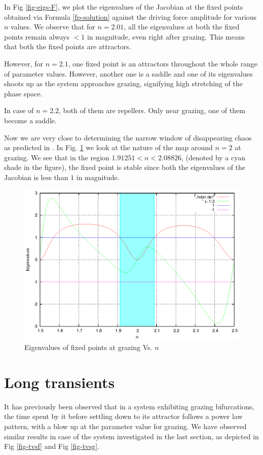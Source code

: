 \documentclass{book}
\renewcommand{\(}{\begin{columns}}
\renewcommand{\)}{\end{columns}}
\newcommand{\<}[1]{\begin{column}{#1}}
\renewcommand{\>}{\end{column}}
\begin{document}
In Fig \ref{fig-eigs-F}, we plot the eigenvalues of the Jacobian at the fixed 
points obtained via Formula \eqref{fp-solution} against the driving force 
amplitude for various $n$ values.  We observe that for $n=2.01$, all the 
eigenvalues at both the fixed points remain always $<1$ in magnitude, even right after grazing.  This 
means that both the fixed points are attractors.  


However, for $n=2.1$, one fixed point is an attractors throughout the whole 
range of parameter values.  However, another one is a saddle and one of its 
eigenvalues shoots up as the system approaches grazing, signifying high 
stretching of the phase space.  


In case of $n=2.2$, both of them are repellers.  Only near grazing, one of 
them become a saddle.   

Now we are very close to determining the narrow window of disappearing chaos 
as predicted in \cite{banerjee-kundu-soft}. In Fig. \ref{fig-eigs-n} we look 
at the nature of the map around $n=2$ at grazing.  We see that in the region 
$1.91251<n<2.08826$, (denoted by a cyan shade in the figure), the fixed point 
is stable since both the eigenvalues of the Jacobian is less than $1$ in 
magnitude.  

\begin{figure}[!htp]
\begin{center}
\caption{Eigenvalues of fixed points at grazing Vs. $n$}
\label{fig-eigs-n}
\includegraphics[width=0.7\columnwidth]{region-fp-stable-around-2}
\end{center}
\end{figure}


\section{Long transients}
It has previously been observed that in a system exhibiting grazing 
bifurcations, the time spent by it before settling down to its attractor 
follows a power law pattern, with a blow up at the parameter value for 
grazing.  We have observed similar results in case of  the system investigated 
in the last section, as depicted in Fig \ref{fig-tvsf} and Fig \ref{fig-tvsg}. 
\end{document}
